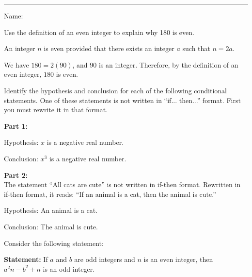 \documentclass[10pt]{exam}
\begin{document}
\hrule

\vspace{.50cm} Name:
\vspace{.25cm}
\begin{questions}
\question Use the definition of an even integer to explain why 180 is even.

\begin{solution}
An integer $n$ is even provided that there exists an integer $a$ such that $n = 2a$.

We have $180 = 2(90)$, and $90$ is an integer. Therefore, by the definition of an even integer, $180$ is even.
\end{solution}

\question Identify the hypothesis and conclusion for each of the following conditional statements. One of these statements is not written in ``if... then...'' format. First you must rewrite it in that format.


\begin{solution}
\textbf{Part 1:}

Hypothesis: $x$ is a negative real number.

Conclusion: $x^3$ is a negative real number.

\textbf{Part 2:}\\
The statement ``All cats are cute'' is not written in if-then format. Rewritten in if-then format, it reads: ``If an animal is a cat, then the animal is cute.''

Hypothesis: An animal is a cat.

Conclusion: The animal is cute.
\end{solution}

\question Consider the following statement:

\textbf{Statement:} If $a$ and $b$ are odd integers and $n$ is an even integer, then $a^2n - b^2 + n$ is an odd integer.

\begin{parts}

\end{parts}
\end{questions}
\end{document}
